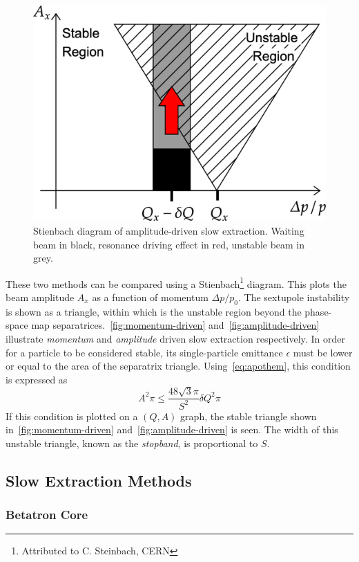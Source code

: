 \documentclass[11pt]{report}
\begin{document}
\begin{figure}[ht]
  \centering
  \includegraphics[width=0.6\linewidth]{amplitude-driven.png}
  \caption{Stienbach diagram of amplitude-driven slow extraction. Waiting beam in black, resonance driving effect in red, unstable beam in grey.}\label{fig:amplitude-driven}
\end{figure}

These two methods can be compared using a Stienbach\footnote{Attributed to C. Steinbach, CERN} diagram. This plots the beam amplitude $A_x$ as a function of momentum $\Delta p/p_0$. The sextupole instability is shown as a triangle, within which is the unstable region beyond the phase-space map separatrices.~\autoref{fig:momentum-driven} and~\autoref{fig:amplitude-driven} illustrate \textit{momentum} and \textit{amplitude} driven slow extraction respectively.
In order for a particle to be considered stable, its single-particle emittance $\epsilon$ must be lower or equal to the area of the separatrix triangle. Using~\autoref{eq:apothem}, this condition is expressed as
\begin{equation}
  A^2\pi\le\frac{48\sqrt 3\pi}{S^2}\delta Q^2\pi
  \label{eq:steinbach}
\end{equation} 
If this condition is plotted on a $(Q, A)$ graph, the stable triangle shown in~\autoref{fig:momentum-driven} and~\autoref{fig:amplitude-driven} is seen. The width of this unstable triangle, known as the \textit{stopband}, is proportional to $S$.


\subsection{Slow Extraction Methods}

\subsubsection{Betatron Core}
\end{document}
